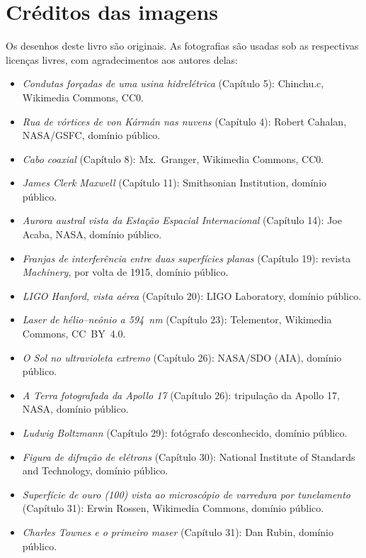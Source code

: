\chapter*{Créditos das imagens}

Os desenhos deste livro são originais. As fotografias são usadas sob
as respectivas licenças livres, com agradecimentos aos autores delas:

\begin{itemize}
  \item \emph{Condutas forçadas de uma usina hidrelétrica}
        (Capítulo 5): Chinchu.c, Wikimedia Commons, CC0.
  \item \emph{Rua de vórtices de von Kármán nas nuvens}
        (Capítulo 4): Robert Cahalan, NASA/GSFC, domínio público.
  \item \emph{Cabo coaxial} (Capítulo 8): Mx.~Granger, Wikimedia
        Commons, CC0.
  \item \emph{James Clerk Maxwell} (Capítulo 11): Smithsonian
        Institution, domínio público.
  \item \emph{Aurora austral vista da Estação Espacial Internacional}
        (Capítulo 14): Joe Acaba, NASA, domínio público.
  \item \emph{Franjas de interferência entre duas superfícies planas}
        (Capítulo 19): revista \emph{Machinery}, por volta de 1915,
        domínio público.
  \item \emph{LIGO Hanford, vista aérea} (Capítulo 20): LIGO
        Laboratory, domínio público.
  \item \emph{Laser de hélio--neônio a 594~nm} (Capítulo 23):
        Telementor, Wikimedia Commons, CC~BY~4.0.
  \item \emph{O Sol no ultravioleta extremo} (Capítulo 26): NASA/SDO
        (AIA), domínio público.
  \item \emph{A Terra fotografada da Apollo 17} (Capítulo 26):
        tripulação da Apollo 17, NASA, domínio público.
  \item \emph{Ludwig Boltzmann} (Capítulo 29): fotógrafo
        desconhecido, domínio público.
  \item \emph{Figura de difração de elétrons} (Capítulo 30): National
        Institute of Standards and Technology, domínio público.
  \item \emph{Superfície de ouro (100) vista ao microscópio de
        varredura por tunelamento} (Capítulo 31): Erwin Rossen,
        Wikimedia Commons, domínio público.
  \item \emph{Charles Townes e o primeiro maser} (Capítulo 31): Dan
        Rubin, domínio público.
\end{itemize}

